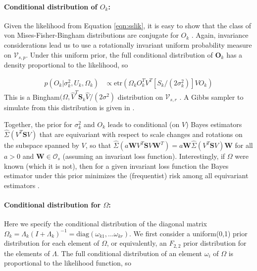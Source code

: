 \documentclass{article}
\newcommand{\bl}[1]{{\mathbf #1}}
\newcommand{\etr}{\text{etr}}
\begin{document}
\paragraph{Conditional distribution of $O_k$:} Given the likelihood
from Equation \ref{eqn:sslik}, it is easy to show that the class of
von Mises-Fisher-Bingham distributions are conjugate for $O_k$
\citep{Hoff2009, Hoff2012}.  Again, invariance considerations
lead us to use a rotationally invariant uniform probability measure on
$\mathcal V_{s,p}$.  Under this uniform prior, the full conditional
distribution of $\bl O_k$ has a density proportional to the
likelihood, so

\begin{align}
\label{lik_vo}
 p(O_k | \sigma^2_k, U_k, \Omega_k) & \propto \etr(\Omega_kO^T_kV^T[S_k/(2\sigma^2_k)]VO_k)
\end{align}
%
\noindent This is a Bingham$(\Omega, \hat{V}^T \bl S_k \hat{V}/(2\sigma^2)$
distribution on $\mathcal V_{s, r}$ \citep{Khatri1977}. A
Gibbs sampler to simulate from this distribution is given in
\citet{Hoff2012}.  

Together, the prior for $\sigma_k^2$ and $O_k$ leads to conditional
(on $V$) Bayes estimators $\hat \Sigma(V^T \bl S V)$ that are
equivariant with respect to scale changes and rotations on the
subspace spanned by $V$, so
that $\hat \Sigma(a \bl W V^T \bl S V \bl W^T) = a \bl W \hat\Sigma(V^T
\bl S V) \bl W$
for all $a>0$ and $\bl W\in \mathcal O_{s}$ (assuming an invariant
loss function). Interestingly, if $\Omega$ were known (which it is
not), then for a given invariant loss function the Bayes estimator
under this prior minimizes the (frequentist) risk among all
equivariant estimators \citep{Eaton1989}.

\paragraph{Conditional distribution for $\Omega$:} Here we specify the conditional
distribution of the diagonal matrix $\Omega_k =
\Lambda_k(I+\Lambda_k)^{-1} = \text{diag}(\omega_{k1}, ... \omega_{kr})$.  We first consider a uniform(0,1) prior distribution for each element of $\Omega$, or
equivalently, an $F_{2,2}$ prior distribution for the elements of
$\Lambda$.  The full conditional distribution of an
element $\omega_i$ of $\Omega$ is proportional to the likelihood
function, so
\end{document}
